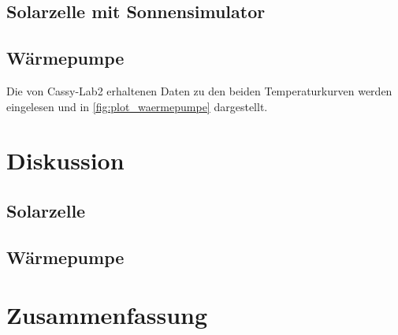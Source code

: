 \documentclass[english, ngerman]{scrartcl}
\begin{document}
\subsection{Solarzelle mit Sonnensimulator}
\label{subsec:auswertung_solar_sonnensimulator}

\subsection{Wärmepumpe}
\label{subsec:auswertung_waermepumpe}

Die von Cassy-Lab2 erhaltenen Daten zu den beiden Temperaturkurven werden eingelesen und in \autoref{fig:plot_waermepumpe} dargestellt.



\section{Diskussion}
\subsection{Solarzelle}
\label{subsec:diskussion_solar}

\subsection{Wärmepumpe}
\label{subsec:diskussion_waermepumpe}


\section{Zusammenfassung}
\label{sec:zusammenfassung}


\clearpage
\printbibliography

\listoffigures

\listoftables
\end{document}
